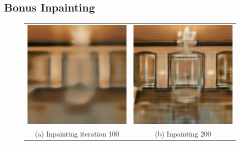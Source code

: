 \documentclass[A4]{article}
\begin{document}
\subsection{Bonus Inpainting}
\begin{figure}[H]
\begin{tabular}{cc}
\includegraphics[width=80mm]{inpainting-iteration-100.png} & \includegraphics[width=80mm]{inpainting-iteration-200.png} \\
(a) Inpainting iteration 100 & (b) Inpainting 200 \\[6pt]

\end{tabular}
\end{figure}
\end{document}
